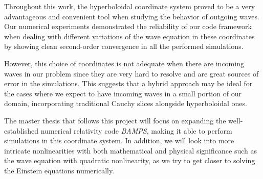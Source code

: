 Throughout this work, the hyperboloidal coordinate system proved to be a very advantageous and convenient tool when studying the behavior of outgoing waves. Our numerical experiments demonstrated the reliability of our code framework when dealing with different variations of the wave equation in these coordinates by showing clean second-order convergence in all the performed simulations.

However, this choice of coordinates is not adequate when there are incoming waves in our problem since they are very hard to resolve and are great sources of error in the simulations. This suggests that a hybrid approach may be ideal for the cases where we expect to have incoming waves in a small portion of our domain, incorporating traditional Cauchy slices alongside hyperboloidal ones.

The master thesis that follows this project will focus on expanding the well-established numerical relativity code \textit{BAMPS}, making it able to perform simulations in this coordinate system. In addition, we will look into more intricate nonlinearities with both mathematical and physical significance such as the wave equation with quadratic nonlinearity, as we try to get closer to solving the Einstein equations numerically.